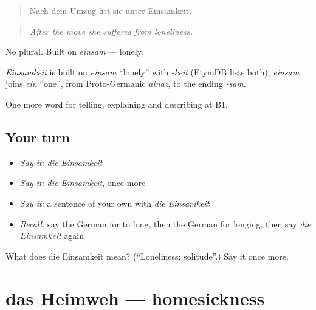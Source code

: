 \begin{quote}
Nach dem Umzug litt sie unter Einsamkeit.
\end{quote}

\begin{quote}
\emph{After the move she suffered from loneliness.}
\end{quote}

No plural. Built on \emph{einsam} — lonely.

\begin{cousinweb}
\emph{Einsamkeit} is built on \emph{einsam} \textquotedblleft{}lonely\textquotedblright{} with \emph{-keit} (EtymDB lists both); \emph{einsam} joins \emph{ein} \textquotedblleft{}one\textquotedblright{}, from Proto-Germanic \emph{ainaz}, to the ending \emph{-sam}.
\end{cousinweb}

\begin{grammarlens}[title={What you've built}]
One more word for telling, explaining and describing at B1.
\end{grammarlens}

\subsection*{Your turn}
\begin{itemize}
\raggedright
  \item \emph{Say it:} \emph{die Einsamkeit}
  \item \emph{Say it:} \emph{die Einsamkeit}, once more
  \item \emph{Say it:} a sentence of your own with \emph{die Einsamkeit}
  \item \emph{Recall:} say the German for to long, then the German for longing, then say \emph{die Einsamkeit} again
\end{itemize}

\begin{tcolorbox}[breakable,colback=teal!4,colframe=teal!35!black,title={Before you move on}]
What does die Einsamkeit mean? (\textquotedblleft{}Loneliness; solitude\textquotedblright{}.) Say it once more.
\end{tcolorbox}
\section[das Heimweh]{das Heimweh — homesickness}

\label{lesson:GE-C472-heimweh}



